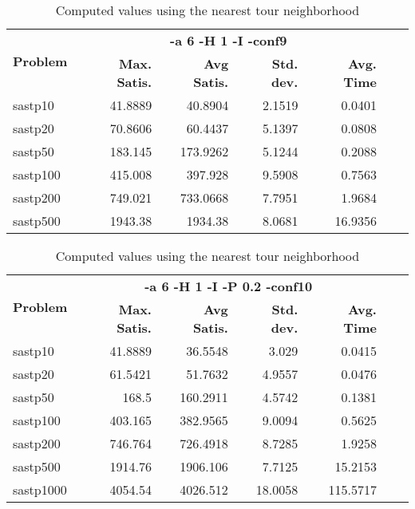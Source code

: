 \documentclass{article}
\begin{document}
\begin{table}[b!]
  \vspace{-6mm}%
  \caption{Computed values using the nearest tour neighborhood}
  \label{tab:NearestTour}
  \setlength{\tabcolsep}{1.4mm}
  \centering
  \begin{tabular}{lrrrrrr}
   \multirow{2}{*}{\bfseries Problem} &
      \multicolumn{4}{c}{\bfseries -a 6 -H 1 -I -conf9 } \\
    &
    \bfseries Max. Satis. &
    \bfseries Avg Satis. &
    \bfseries Std. dev. &
    \bfseries Avg. Time 
    \\\hline
sastp10 & 41.8889 & 40.8904 & 2.1519 & 0.0401 \\ 
sastp20 & 70.8606 & 60.4437 & 5.1397 & 0.0808 \\ 
sastp50 & 183.145 & 173.9262 & 5.1244 & 0.2088 \\ 
sastp100 & 415.008 & 397.928 & 9.5908 & 0.7563 \\ 
sastp200 & 749.021 & 733.0668 & 7.7951 & 1.9684 \\ 
sastp500 & 1943.38 & 1934.38 & 8.0681 & 16.9356
    \\\hline
  \end{tabular}

\end{table}

\begin{table}[b!]
  \vspace{-6mm}%
  \caption{Computed values using the nearest tour neighborhood}
  \label{tab:NearestTour}
  \setlength{\tabcolsep}{1.4mm}
  \centering
  \begin{tabular}{lrrrrrr}
   \multirow{2}{*}{\bfseries Problem} &
      \multicolumn{4}{c}{\bfseries -a 6 -H 1 -I -P 0.2 -conf10 } \\
    &
    \bfseries Max. Satis. &
    \bfseries Avg Satis. &
    \bfseries Std. dev. &
    \bfseries Avg. Time 
    \\\hline
sastp10 & 41.8889 & 36.5548 & 3.029 & 0.0415 \\ 
sastp20 & 61.5421 & 51.7632 & 4.9557 & 0.0476 \\ 
sastp50 & 168.5 & 160.2911 & 4.5742 & 0.1381 \\ 
sastp100 & 403.165 & 382.9565 & 9.0094 & 0.5625 \\ 
sastp200 & 746.764 & 726.4918 & 8.7285 & 1.9258 \\ 
sastp500 & 1914.76 & 1906.106 & 7.7125 & 15.2153 \\ 
sastp1000 & 4054.54 & 4026.512 & 18.0058 & 115.5717
    \\\hline
  \end{tabular}

\end{table}
\end{document}
